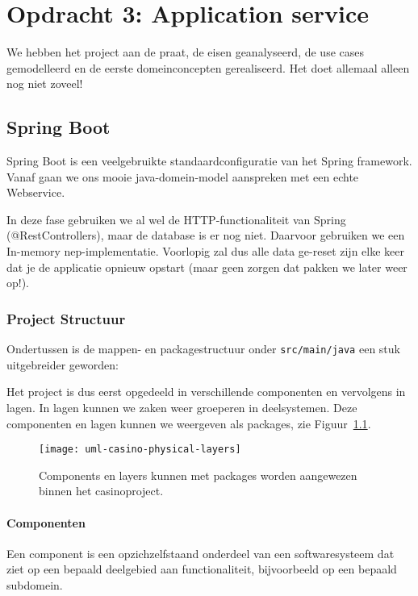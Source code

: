 \chapter{Opdracht 3: Application service}
We hebben het project aan de praat, de eisen geanalyseerd, 
de use cases gemodelleerd en de eerste domeinconcepten gerealiseerd. 
Het doet allemaal alleen nog niet zoveel!

\section{Spring Boot}
Spring Boot is een veelgebruikte standaardconfiguratie van het Spring framework. 
Vanaf gaan we ons mooie java-domein-model aanspreken met een echte Webservice.

In deze fase gebruiken we al wel de HTTP-functionaliteit van Spring (@RestControllers), maar
de database is er nog niet. Daarvoor gebruiken we een In-memory nep-implementatie. Voorlopig 
zal dus alle data ge-reset zijn elke keer dat je de applicatie opnieuw opstart (maar geen zorgen
dat pakken we later weer op!).

\subsection{Project Structuur}

Ondertussen is de mappen- en packagestructuur onder \texttt{src/main/java} een stuk uitgebreider geworden:


Het project is dus eerst opgedeeld in verschillende componenten en vervolgens in 
lagen. In lagen kunnen we zaken weer groeperen in deelsystemen. Deze componenten 
en lagen kunnen we weergeven als packages, zie Figuur~\ref{fig:uml-casino-physical-layers}.

\begin{figure}[H]
    \centering
    \texttt{[image: uml-casino-physical-layers]}
    \caption{Components en layers kunnen met packages worden aangewezen binnen het casinoproject.}
    \label{fig:uml-casino-physical-layers}
\end{figure}

\subsubsection{Componenten}
Een component is een opzichzelfstaand onderdeel van een softwaresysteem
dat ziet op een bepaald deelgebied aan functionaliteit, bijvoorbeeld op een 
bepaald subdomein.

